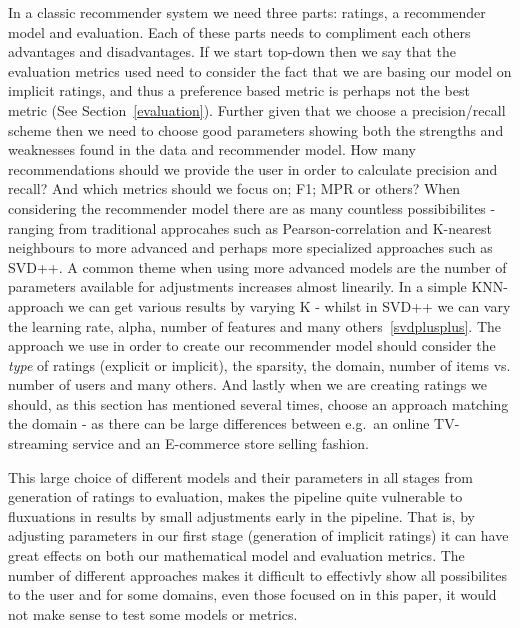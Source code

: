 In a classic recommender system we need three parts: ratings, a recommender
model and evaluation. Each of these parts needs to compliment each others
advantages and disadvantages. If we start top-down then we say that the
evaluation metrics used need to consider the fact that we are basing our model
on implicit ratings, and thus a preference based metric is perhaps not the best
metric (See Section~\ref{evaluation}). Further given that we choose a
precision/recall scheme then we need to choose good parameters showing both the
strengths and weaknesses found in the data and recommender model. How many
recommendations should we provide the user in order to calculate precision and
recall? And which metrics should we focus on; F1; MPR or others?
When considering the recommender model there are as many countless
possibibilites - ranging from traditional approcahes such as
Pearson-correlation and K-nearest neighbours to more advanced and perhaps more
specialized approaches such as SVD++. A common theme when using more advanced
models are the number of parameters available for adjustments increases almost
linearily. In a simple KNN-approach we can get various results by varying K -
whilst in SVD++ we can vary the learning rate, alpha, number of features and
many others~\ref{svdplusplus}. The approach we use in order to create our
recommender model should consider the \textit{type} of ratings (explicit or
implicit), the sparsity, the domain, number of items vs. number of users and
many others. And lastly when we are creating ratings we should, as this section
has mentioned several times, choose an approach matching the domain - as there
can be large differences between e.g.\ an online TV-streaming service and an
E-commerce store selling fashion.


This large choice of different models and their parameters in all stages from
generation of ratings to evaluation, makes the pipeline quite vulnerable to
fluxuations in results by small adjustments early in the pipeline. That is, by
adjusting parameters in our first stage (generation of implicit ratings) it can
have great effects on both our mathematical model and evaluation metrics. The
number of different approaches makes it difficult to effectivly show all
possibilites to the user and for some domains, even those focused on in this
paper, it would not make sense to test some models or metrics.

